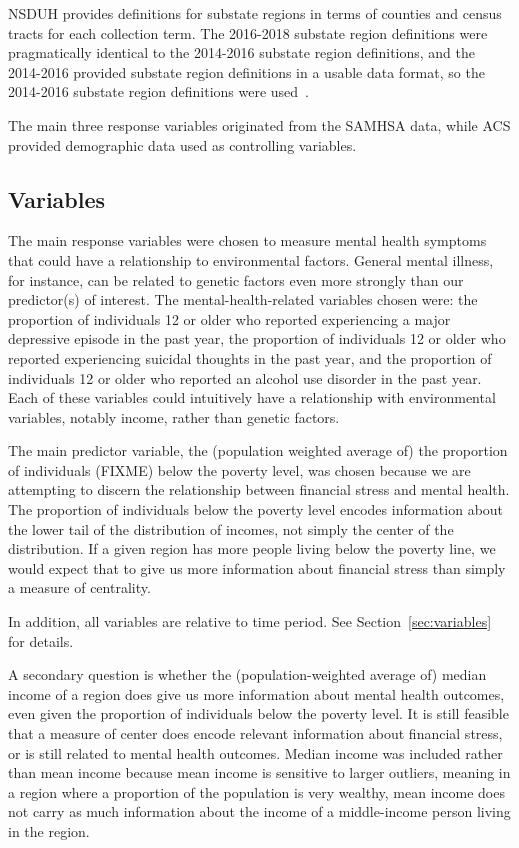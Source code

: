 \documentclass{article}
\begin{document}
NSDUH provides definitions for substate regions in terms of
counties and census tracts for each collection term.
The 2016-2018 substate region definitions were
pragmatically identical to the 2014-2016 substate region definitions,
and the 2014-2016 provided substate region definitions in a
usable data format, so the 2014-2016 substate region definitions
were used~\cite{samhsa_substate_region_defs}.

The main three response variables originated from the
SAMHSA data, while ACS provided demographic data used as controlling variables.

\subsection{Variables}\label{sec:finalvars}

The main response variables were chosen to measure mental health
symptoms that could have a relationship to environmental factors.
General mental illness, for instance, can be related to genetic factors
even more strongly than our predictor(s) of interest. The
mental-health-related variables chosen were: the proportion of individuals 12
or older who reported experiencing a major depressive episode in the
past year, the proportion of individuals 12 or older who reported
experiencing suicidal thoughts in the past year, and the proportion of
individuals 12 or older who reported an alcohol use disorder in the past
year. Each of these variables could intuitively have a relationship with
environmental variables, notably income, rather than genetic factors.

The main predictor variable, the (population weighted average of) the
proportion of individuals (FIXME) below the poverty level, was chosen
because we are attempting to discern the relationship between financial
stress and mental health. The proportion of individuals below the
poverty level encodes information about the lower tail of the
distribution of incomes, not simply the center of the distribution.
If a given region has more people living below the poverty line, we
would expect that to give us more information about financial stress
than simply a measure of centrality.

In addition, all variables are relative to time period.
See Section~\ref{sec:variables} for details.

A secondary question is whether the (population-weighted average of)
median income of a region does give us more information about mental
health outcomes, even given the proportion of individuals below the
poverty level. It is still feasible that a measure of center does encode
relevant information about financial stress, or is still related to
mental health outcomes. Median income was included rather than mean
income because mean income is sensitive to larger outliers, meaning in a
region where a proportion of the population is very wealthy, mean income
does not carry as much information about the income of a middle-income person
living in the region.
\end{document}
